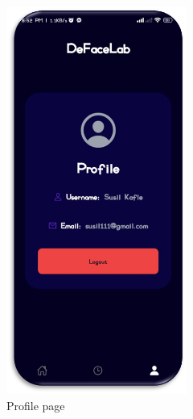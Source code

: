 \begin{figure}[ht]
    \centering
    \includegraphics[height= 5in]{img/profilev2.png}
    \caption{{Profile page}}
\end{figure}